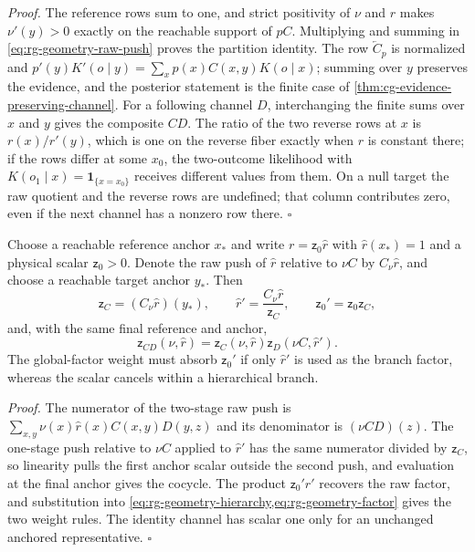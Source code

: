 \noindent\emph{Proof.}
The reference rows sum to one, and strict positivity of $\nu$ and $r$ makes
$\nu'(y)>0$ exactly on the reachable support of $pC$. Multiplying and
summing in \cref{eq:rg-geometry-raw-push} proves the partition identity.
The row $\overleftarrow C_p$ is normalized and
$p'(y)K'(o\mid y)=\sum_xp(x)C(x,y)K(o\mid x)$; summing over $y$ preserves the
evidence, and the posterior statement is the finite case of
\cref{thm:cg-evidence-preserving-channel}. For a following channel $D$,
interchanging the finite sums over $x$ and $y$ gives the composite $CD$. The
ratio of the two reverse rows at $x$ is $r(x)/r'(y)$, which is one on the
reverse fiber exactly when $r$ is constant there; if the rows differ at some
$x_0$, the two-outcome likelihood with $K(o_1\mid x)=\mathbf1_{\{x=x_0\}}$
receives different values from them. On a null target the raw
quotient and the reverse rows are undefined; that column contributes zero,
even if the next channel has a nonzero row there. $\square$

Choose a reachable reference anchor $x_*$ and write $r=\mathsf z_0\widehat r$
with $\widehat r(x_*)=1$ and a physical scalar $\mathsf z_0>0$. Denote the raw
push of $\widehat r$ relative to $\nu C$ by $C_\nu\widehat r$, and choose a
reachable target anchor $y_*$. Then
\begin{equation}
 \mathsf z_C=(C_\nu\widehat r)(y_*),\qquad
 \widehat r'=\frac{C_\nu\widehat r}{\mathsf z_C},\qquad
 \mathsf z_0'=\mathsf z_0\mathsf z_C,
 \label{eq:rg-geometry-anchor}
\end{equation}
and, with the same final reference and anchor,
\begin{equation}
 \mathsf z_{CD}(\nu,\widehat r)
 =\mathsf z_C(\nu,\widehat r)
   \mathsf z_D(\nu C,\widehat r').
 \label{eq:rg-geometry-scalar-cocycle}
\end{equation}
The global-factor weight must absorb $\mathsf z_0'$ if only $\widehat r'$ is used
as the branch factor, whereas the scalar cancels within a hierarchical
branch. 

\noindent\emph{Proof.}
The numerator of the two-stage raw push is
$\sum_{x,y}\nu(x)\widehat r(x)C(x,y)D(y,z)$ and its denominator is
$(\nu CD)(z)$. The one-stage push relative to $\nu C$ applied to
$\widehat r'$ has the same numerator divided by $\mathsf z_C$, so linearity
pulls the first anchor scalar outside the second push, and evaluation at the
final anchor gives the cocycle. The product $\mathsf z_0'\widehat r'$ recovers
the raw factor, and substitution into
\cref{eq:rg-geometry-hierarchy,eq:rg-geometry-factor} gives the two weight
rules. The identity channel has scalar one only for an unchanged anchored
representative. $\square$

